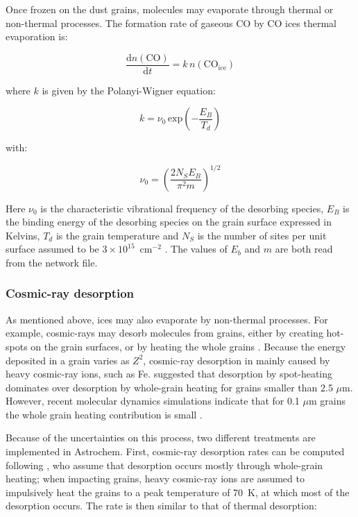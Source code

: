 \documentclass[a4paper,12pt]{article}
\newcommand{\conc}[1]{n(\mathrm{#1})}
\begin{document}
Once frozen on the dust grains, molecules may evaporate through
thermal or non-thermal processes. The formation rate of gaseous CO by
CO ices thermal evaporation is:

\begin{equation}
  \frac{\mathrm{d}\conc{CO}}{\mathrm{d}t} = k \, \conc{CO_{ice}}
\end{equation}

\noindent
where $k$ is given by the Polanyi-Wigner equation:

\begin{equation}
  k = \nu_{0} \, \mathrm{exp} \left( - \frac{E_{B}}{T_{d}} \right)
  \label{eq:thermal-desorption}
\end{equation}

\noindent
with:

\begin{equation}
  \nu_{0} = \left( \frac{2 N_{S} E_{B}}{\pi^2 m} \right)^{1/2}
  \label{eq:vibration-freq}
\end{equation}

\noindent
Here $\nu_{0}$ is the characteristic vibrational frequency of the
desorbing species, $E_{B}$ is the binding energy of the desorbing
species on the grain surface expressed in Kelvins, $T_{d}$ is the
grain temperature and $N_{S}$ is the number of sites per unit surface
assumed to be $3 \times 10^{15}$~cm$^{-2}$ \citep{Hasegawa92}. The
values of $E_{b}$ and $m$ are both read from the network file.

\subsubsection{Cosmic-ray desorption}
\label{sec:cosm-ray-desorpt}

As mentioned above, ices may also evaporate by non-thermal
processes. For example, cosmic-rays may desorb molecules from grains,
either by creating hot-spots on the grain surfaces, or by heating the
whole grains \citep{Leger85}. Because the energy deposited in a grain
varies as $Z^{2}$, cosmic-ray desorption in mainly caused by heavy
cosmic-ray ions, such as Fe. \cite{Leger85} suggested that desorption
by spot-heating dominates over desorption by whole-grain heating for
grains smaller than 2.5 $\mu$m. However, recent molecular dynamics
simulations indicate that for 0.1 $\mu$m grains the whole grain
heating contribution is small \citep{Bringa04}.

Because of the uncertainties on this process, two different treatments
are implemented in Astrochem. First, cosmic-ray desorption rates can
be computed following \citet{Hasegawa93}, who assume that desorption
occurs mostly through whole-grain heating; when impacting grains,
heavy cosmic-ray ions are assumed to impulsively heat the grains to a
peak temperature of 70~K, at which most of the desorption occurs. The
rate is then similar to that of thermal desorption:
\end{document}
